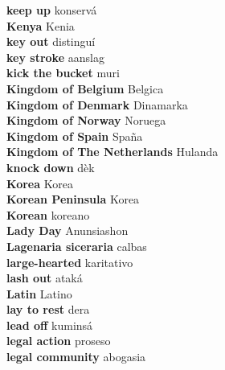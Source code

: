 \textbf{ keep up  } konservá \\
\textbf{ Kenya  } Kenia \\
\textbf{ key out  } distinguí \\
\textbf{ key stroke  } aanslag \\
\textbf{ kick the bucket  } muri \\
\textbf{ Kingdom of Belgium  } Belgica \\
\textbf{ Kingdom of Denmark  } Dinamarka \\
\textbf{ Kingdom of Norway  } Noruega \\
\textbf{ Kingdom of Spain  } Spaña \\
\textbf{ Kingdom of The Netherlands  } Hulanda \\
\textbf{ knock down  } dèk \\
\textbf{ Korea  } Korea \\
\textbf{ Korean Peninsula  } Korea \\
\textbf{ Korean  } koreano \\
\textbf{ Lady Day  } Anunsiashon \\
\textbf{ Lagenaria siceraria  } calbas \\
\textbf{ large-hearted  } karitativo \\
\textbf{ lash out  } ataká \\
\textbf{ Latin  } Latino \\
\textbf{ lay to rest  } dera \\
\textbf{ lead off  } kuminsá \\
\textbf{ legal action  } proseso \\
\textbf{ legal community  } abogasia \\
